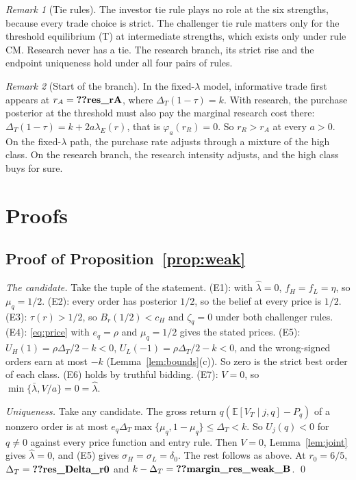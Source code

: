 \documentclass[12pt]{article}
\theoremstyle{definition}
\theoremstyle{remark}
\newtheorem{remark}{Remark}
\newcommand{\E}{\mathbb E}
\newcommand{\DT}{\Delta_T}
\newcommand{\lh}{\hat\lambda}
\newcommand{\lb}{\bar\lambda}
\begin{document}
\begin{remark}[Tie rules]\label{rem:ties}
The investor tie rule plays no role at the six strengths, because every trade choice is strict. The challenger tie
rule matters only for the threshold equilibrium (T) at intermediate strengths, which exists only under rule CM.
Research never has a tie. The research branch, its strict rise and the endpoint uniqueness hold under all four
pairs of rules.
\end{remark}

\begin{remark}[Start of the branch]\label{rem:start}
In the fixed-$\lambda$ model, informative trade first appears at $r_A=\reg{res_rA}$, where $\DT(1-\tau)=k$. With
research, the purchase posterior at the threshold must also pay the marginal research cost there:
$\DT(1-\tau)=k+2a\lambda_E(r)$, that is $\varphi_a(r_R)=0$. So $r_R>r_A$ at every $a>0$. On the fixed-$\lambda$
path, the purchase rate adjusts through a mixture of the high class. On the research branch, the research intensity
adjusts, and the high class buys for sure.
\end{remark}

\section{Proofs}\label{sec:proofs}

\subsection{Proof of Proposition~\ref{prop:weak}}

\emph{The candidate.} Take the tuple of the statement. (E1): with $\lh=0$, $f_H=f_L=\eta$, so $\mu_q=1/2$. (E2):
every order has posterior $1/2$, so the belief at every price is $1/2$. (E3): $\tau(r)>1/2$, so
$B_r(1/2)<c_H$ and $\zeta_q=0$ under both challenger rules. (E4): \eqref{eq:price} with $e_q=\rho$ and
$\mu_q=1/2$ gives the stated prices. (E5): $U_H(1)=\rho\DT/2-k<0$,
$U_L(-1)=\rho\DT/2-k<0$, and the wrong-signed orders earn at most $-k$ (Lemma~\ref{lem:bounds}(c)). So zero is the
strict best order of each class. (E6) holds by truthful bidding. (E7): $V=0$, so $\min\{\lb,V/a\}=0=\lh$.

\emph{Uniqueness.} Take any candidate. The gross return $q(\E[V_T\mid j,q]-P_q)$ of a nonzero order is at most
$e_q\DT\max\{\mu_q,1-\mu_q\}\le\DT<k$. So $U_j(q)<0$ for $q\neq0$ against every price function and entry rule.
Then $V=0$, Lemma~\ref{lem:joint} gives $\lh=0$, and (E5) gives $\sigma_H=\sigma_L=\delta_0$. The rest follows as
above. At $r_0=6/5$, $\DT=\reg{res_Delta_r0}$ and $k-\DT=\reg{margin_res_weak_B}$. \qed
\end{document}
